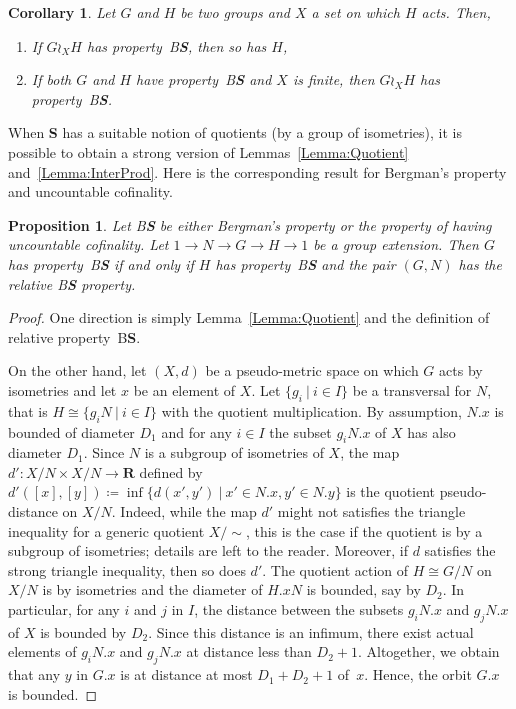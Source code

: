 \documentclass[a4paper]{article}
\newcommand{\PH}[1]{\todo[color={blue!33},size=small]{\textbf{PH :} #1}}
\newtheorem{cor}[lem]{Corollary}
\newtheorem{prop}[lem]{Proposition}
\theoremstyle{definition}
\newcommand*{\field}[1]{\mathbf{#1}}
\newcommand*{\category}[1]{\textbf{#1}}
\newcommand*{\CatS}{\category{S}}
\newcommand*{\R}{\field{R}}
\newcommand*{\BS}{B\textbf{S}}
\newcommand{\setst}[2]{\{#1\ |\ #2\}}
\begin{document}
%
%
\begin{cor}\label{Cor:Wreath}
Let $G$ and $H$ be two groups and $X$ a set on which $H$ acts.%
Then,
\begin{enumerate}
\item
If $G\wr_X H$ has property~\BS, then so has $H$,
\item
If both $G$ and $H$ have property~\BS{} and $X$ is finite, then $G\wr_X H$ has property~\BS.
\end{enumerate}
\end{cor}
%
%
When \CatS{} has a suitable notion of quotients (by a group of isometries), it is possible to obtain a strong version of Lemmas~\ref{Lemma:Quotient} and~\ref{Lemma:InterProd}.
Here is the corresponding result for Bergman's property and uncountable cofinality.
%
%
\begin{prop}\label{Prop:Extension}
Let \BS{} be either Bergman's property or the property of having uncountable cofinality.
Let $1\to N\to G\to H\to 1$ be a group extension.
Then $G$ has property~\BS{} if and only if $H$ has property~\BS{} and the pair $(G,N)$ has the relative \BS{} property.
\end{prop}
\begin{proof}
One direction is simply Lemma~\ref{Lemma:Quotient} and the definition of relative property~\BS.

On the other hand, let $(X,d)$ be a pseudo-metric space on which $G$ acts %
by isometries and let $x$ be an element of $X$.
Let $\setst{g_i}{i\in I}$ be a transversal for $N$, that is $H\cong\setst{g_iN}{i\in I}$ with the quotient multiplication.
By assumption, $N.x$ is bounded of diameter $D_1$ and for any $i\in I$ the subset $g_iN.x$ of $X$ has also diameter $D_1$.
Since $N$ is a subgroup of isometries of $X$, the map $d'\colon X/N\times X/N\to\R$ defined by $d'([x],[y])\coloneqq\inf\setst{d(x',y')}{x'\in N.x,y'\in N.y}$ is the quotient pseudo-distance on $X/N$.
Indeed, while the map $d'$ might not satisfies the triangle inequality for a generic quotient $X/\sim$, this is the case if the quotient is by a subgroup of isometries; details are left to the reader.
Moreover, if $d$ satisfies the strong triangle inequality, then so does $d'$.
The quotient action of $H\cong G/N$ on $X/N$ is %
by isometries and the diameter of $H.xN$ is bounded, say by $D_2$.
In particular, for any $i$ and $j$ in $I$, the distance between the subsets $g_iN.x$ and $g_jN.x$ of $X$ is bounded by $D_2$.
Since this distance is an infimum, there exist actual elements of $g_iN.x$ and $g_jN.x$ at distance less than $D_2+1$.
Altogether, we obtain that any $y$ in $G.x$ is at distance at most $D_1+D_2+1$ of~$x$.
Hence, the orbit $G.x$ is bounded.
\end{proof}
\end{document}
